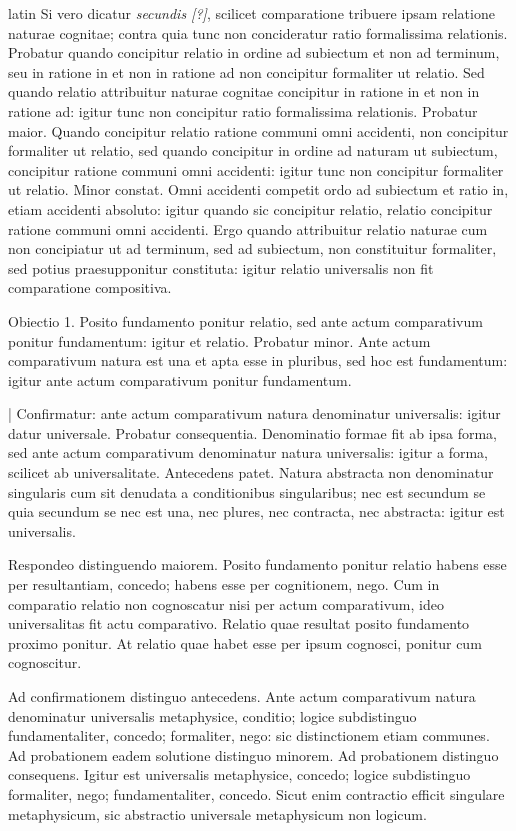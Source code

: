 \begin{otherlanguage*}{latin}
\pstart
Si vero dicatur \emph{secundis [?]}, scilicet comparatione tribuere ipsam relatione naturae cognitae; contra quia tunc non concideratur ratio formalissima relationis. Probatur quando concipitur relatio in ordine ad subiectum et non ad terminum, seu in ratione in et non in ratione ad non concipitur formaliter ut relatio. Sed quando relatio attribuitur naturae cognitae concipitur in ratione in et non in ratione ad:
igitur tunc non concipitur ratio formalissima relationis. Probatur maior. Quando concipitur relatio ratione communi omni accidenti, non concipitur formaliter ut relatio, sed quando concipitur in ordine ad naturam ut subiectum, concipitur ratione communi omni accidenti:
igitur tunc non concipitur formaliter ut relatio. Minor constat. Omni accidenti competit ordo ad subiectum et ratio in, etiam accidenti absoluto:
igitur quando sic concipitur relatio, relatio concipitur ratione communi omni accidenti. Ergo quando attribuitur relatio naturae cum non concipiatur ut ad terminum, sed ad subiectum, non constituitur formaliter, sed potius praesupponitur constituta:
igitur relatio universalis non fit comparatione compositiva. 
\pend

\pstart
Obiectio 1. Posito fundamento ponitur relatio, sed ante actum comparativum ponitur fundamentum:
igitur et relatio. Probatur minor. Ante actum comparativum natura est una et apta esse in pluribus, sed hoc est fundamentum:
igitur ante actum comparativum ponitur fundamentum. 
\pend

\pstart
\textnormal{|} Confirmatur:
ante actum comparativum natura denominatur universalis:
igitur datur universale. Probatur consequentia. Denominatio formae fit ab ipsa forma, sed ante actum comparativum denominatur natura universalis:
igitur a forma, scilicet ab universalitate. Antecedens patet. Natura abstracta non denominatur singularis cum sit denudata a conditionibus singularibus; nec est secundum se quia secundum se nec est una, nec plures, nec contracta, nec abstracta:
igitur est universalis. 
\pend

\pstart
Respondeo distinguendo maiorem. Posito fundamento ponitur relatio habens esse per resultantiam, concedo; habens esse per cognitionem, nego. Cum in comparatio relatio non cognoscatur nisi per actum comparativum, ideo universalitas fit actu comparativo. Relatio quae resultat posito fundamento proximo ponitur. At relatio quae habet esse per ipsum cognosci, ponitur cum cognoscitur. 
\pend

\pstart
Ad confirmationem distinguo antecedens. Ante actum comparativum natura denominatur universalis metaphysice, conditio; logice subdistinguo fundamentaliter, concedo; formaliter, nego:
sic distinctionem etiam communes. Ad probationem eadem solutione distinguo minorem. Ad probationem distinguo consequens. Igitur est universalis metaphysice, concedo; logice subdistinguo formaliter, nego; fundamentaliter, concedo. Sicut enim contractio efficit singulare metaphysicum, sic abstractio universale metaphysicum non logicum. 
\pend


\end{otherlanguage*}
